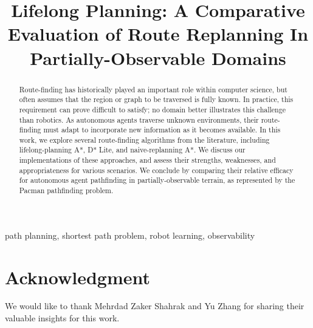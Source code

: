 \documentclass[conference]{IEEEtran}
\begin{document}
\title{Lifelong Planning: A Comparative Evaluation of Route Replanning In Partially-Observable Domains}

\author{
}

\maketitle

\begin{abstract}
Route-finding has historically played an important role within computer science, but often assumes that the region or graph to be traversed is fully known. In practice, this requirement can prove difficult to satisfy; no domain better illustrates this challenge than robotics. As autonomous agents traverse unknown environments, their route-finding must adapt to incorporate new information as it becomes available. In this work, we explore several route-finding algorithms from the literature, including lifelong-planning A*, D* Lite, and naive-replanning A*. We discuss our implementations of these approaches, and assess their strengths, weaknesses, and appropriateness for various scenarios. We conclude by comparing their relative efficacy for autonomous agent pathfinding in partially-observable terrain, as represented by the Pacman pathfinding problem.
\end{abstract}

\begin{IEEEkeywords}
path planning, shortest path problem, robot learning, observability
\end{IEEEkeywords}














\section*{Acknowledgment}
We would like to thank Mehrdad Zaker Shahrak and Yu Zhang for sharing their valuable insights for this work.



\end{document}
